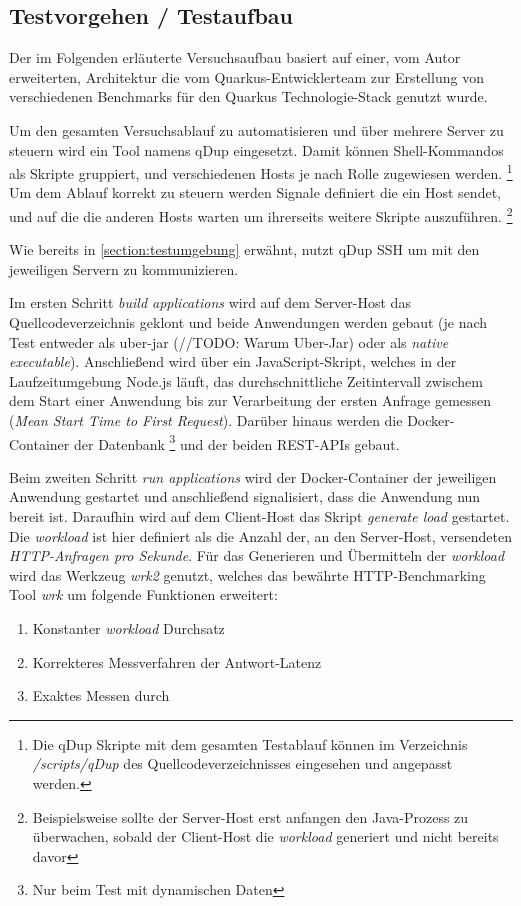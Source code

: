 \subsection{Testvorgehen / Testaufbau}
\label{section:vorgehen}
Der im Folgenden erläuterte Versuchsaufbau basiert auf einer, vom Autor erweiterten, Architektur die vom Quarkus-Entwicklerteam
zur Erstellung von verschiedenen Benchmarks für den Quarkus Technologie-Stack genutzt wurde.
\parencite{QuarkusBlog, QuarkusJohnaohara}

Um den gesamten Versuchsablauf zu automatisieren und über mehrere Server zu steuern wird ein Tool namens qDup eingesetzt.
Damit können Shell-Kommandos als Skripte gruppiert, und verschiedenen Hosts je nach Rolle zugewiesen werden.
\footnote{Die qDup Skripte mit dem gesamten Testablauf können im Verzeichnis \textit{/scripts/qDup} des Quellcodeverzeichnisses eingesehen und
    angepasst werden.}
Um dem Ablauf korrekt zu steuern werden Signale definiert die ein Host sendet, und auf die die anderen Hosts warten um ihrerseits
weitere Skripte auszuführen.
\footnote{Beispielsweise sollte der Server-Host erst anfangen den Java-Prozess zu überwachen, sobald der Client-Host die \textit{workload}
    generiert und nicht bereits davor}


Wie bereits in \ref{section:testumgebung} erwähnt, nutzt qDup SSH um mit den jeweiligen Servern zu kommunizieren.

Im ersten Schritt \textit{build applications} wird auf dem Server-Host das Quellcodeverzeichnis geklont und beide Anwendungen werden gebaut
(je nach Test entweder als uber-jar (//TODO: Warum Uber-Jar) oder als \textit{native executable}). Anschließend wird über ein JavaScript-Skript,
welches in der Laufzeitumgebung Node.js läuft, das durchschnittliche Zeitintervall zwischem dem Start einer Anwendung bis
zur Verarbeitung der ersten Anfrage gemessen
(\textit{Mean Start Time to First Request}). Darüber hinaus werden die Docker-Container der Datenbank
\footnote{Nur beim Test mit dynamischen Daten} und der beiden REST-APIs gebaut.

Beim zweiten Schritt \textit{run applications} wird der Docker-Container der jeweiligen Anwendung gestartet und anschließend signalisiert,
dass die Anwendung nun bereit ist.
Daraufhin wird auf dem Client-Host das Skript \textit{generate load} gestartet.
Die \textit{workload} ist hier definiert als die Anzahl der, an den Server-Host, versendeten \textit{HTTP-Anfragen pro Sekunde}.
Für das Generieren und Übermitteln der \textit{workload} wird das Werkzeug \textit{wrk2} genutzt, welches das
bewährte HTTP-Benchmarking Tool \textit{wrk} um folgende Funktionen erweitert:
\begin{enumerate}
    \item Konstanter \textit{workload} Durchsatz
    \item Korrekteres Messverfahren der Antwort-Latenz
    \item Exaktes Messen durch 
\end{enumerate}\parencite{Wrk2, Wrk}

